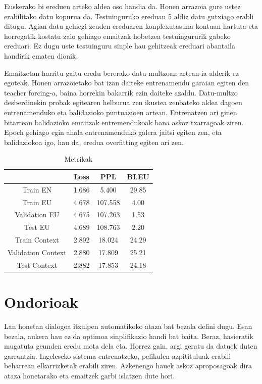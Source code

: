 \documentclass[11pt,a4paper]{article}
\begin{document}
Euskerako bi ereduen arteko aldea oso handia da. Honen arrazoia gure ustez erabilitako datu kopurua da. Testuinguruko ereduan 5 aldiz datu gutxiago erabli ditugu. Agian datu gehiegi zeuden ereduaren konplexutasuna kontuan hartuta eta horregatik kostatu zaio gehiago emaitzak hobetzea testuingururik gabeko ereduari. Ez dugu uste testuinguru sinple hau gehitzeak ereduari abantaila handirik ematen dionik.

Emaitzetan harritu gaitu eredu bererako datu-multzoan artean ia alderik ez egoteak. Honen arrazoietako bat izan daiteke entrenamendu garaian egiten den teacher forcing-a, baina horrekin bakarrik ezin daiteke azaldu. Datu-multzo desberdinekin probak egitearen helburua zen ikustea zenbateko aldea dagoen entrenamenduko eta balidazioko puntuazioen artean. Entrenatzen ari ginen bitartean balidazioko emaitzak entremendukoak bana askoz txarragoak ziren. Epoch gehiago egin ahala entrenamenduko galera jaitsi egiten zen, eta balidaziokoa igo, hau da, eredua overfitting egiten ari zen.

\begin{table}
\centering
\begin{tabular}{ |c|c|c|c| } 
    \hline
    & Loss & PPL & BLEU \\
    \hline
    Train EN & 1.686 & 5.400 & 29.85 \\ 
    \hline
    Train EU & 4.678 & 107.558 & 4.00 \\ 
    Validation EU & 4.675 & 107.263 & 1.53 \\ 
    Test EU & 4.689 & 108.763 & 2.20 \\ 
    \hline
    Train Context & 2.892 & 18.024 & 24.29 \\ 
    Validation Context & 2.880 & 17.809 & 25.21 \\ 
    Test Context & 2.882 & 17.853 & 24.18 \\ 
    \hline
\end{tabular}
\caption{Metrikak}
\label{tab:metrics}
\end{table}

\section{Ondorioak}
Lan honetan dialogoa itzulpen automatikoko ataza bat bezala defini dugu. Esan bezala, aukera hau ez da optimoa sinplifikazio handi bat baita. Beraz, hasieratik mugatuta geunden eredu mota dela eta. Horrez gain, argi geratu da datuek duten garrantzia. Ingeleseko sistema entrenatzeko, pelikulen azpitituluak erabili beharrean elkarrizketak erabili ziren. Azkenengo hauek askoz aproposagoak dira ataza honetarako eta emaitzek garbi islatzen dute hori. 



\end{document}
